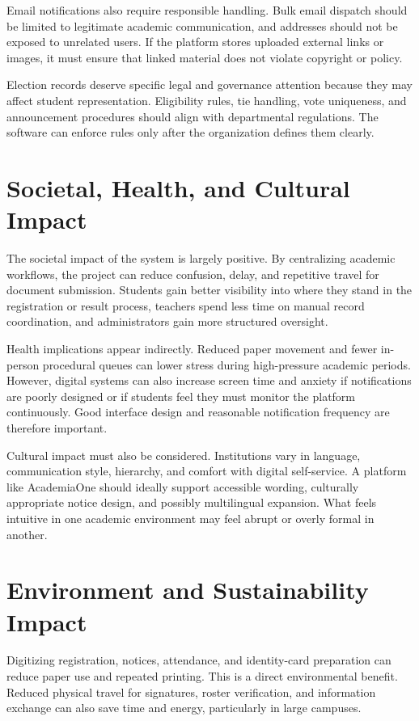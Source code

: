 \documentclass[12pt,a4paper]{report}
\newcommand{\systemName}{AcademiaOne}
\begin{document}
Email notifications also require responsible handling. Bulk email dispatch should be limited to legitimate academic communication, and addresses should not be exposed to unrelated users. If the platform stores uploaded external links or images, it must ensure that linked material does not violate copyright or policy.

Election records deserve specific legal and governance attention because they may affect student representation. Eligibility rules, tie handling, vote uniqueness, and announcement procedures should align with departmental regulations. The software can enforce rules only after the organization defines them clearly.

\section{Societal, Health, and Cultural Impact}
The societal impact of the system is largely positive. By centralizing academic workflows, the project can reduce confusion, delay, and repetitive travel for document submission. Students gain better visibility into where they stand in the registration or result process, teachers spend less time on manual record coordination, and administrators gain more structured oversight.

Health implications appear indirectly. Reduced paper movement and fewer in-person procedural queues can lower stress during high-pressure academic periods. However, digital systems can also increase screen time and anxiety if notifications are poorly designed or if students feel they must monitor the platform continuously. Good interface design and reasonable notification frequency are therefore important.

Cultural impact must also be considered. Institutions vary in language, communication style, hierarchy, and comfort with digital self-service. A platform like \systemName{} should ideally support accessible wording, culturally appropriate notice design, and possibly multilingual expansion. What feels intuitive in one academic environment may feel abrupt or overly formal in another.

\section{Environment and Sustainability Impact}
Digitizing registration, notices, attendance, and identity-card preparation can reduce paper use and repeated printing. This is a direct environmental benefit. Reduced physical travel for signatures, roster verification, and information exchange can also save time and energy, particularly in large campuses.
\end{document}
